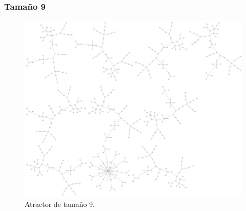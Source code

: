 \documentclass[11pt]{article}
\begin{document}
			\subsubsection{Tamaño 9}
			\begin{figure}[H]
			\centering
			\includegraphics[scale=0.1]{resources/Atractores22/atractor_22_size_9.png}
			\caption{Atractor de tamaño 9.}\label{fig:picture}
			\end{figure}
\end{document}
